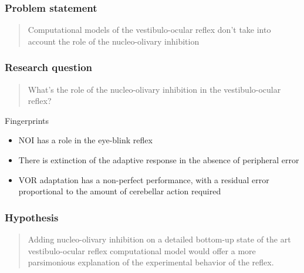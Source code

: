 \documentclass[10pt, compress]{beamer}
\begin{document}
\begin{frame}[fragile]
  \frametitle{Problem statement}
  \begin{quote}
    Computational models of the vestibulo-ocular reflex don't take into account the role of the nucleo-olivary inhibition
  \end{quote}
\end{frame}


\begin{frame}[fragile]
  \frametitle{Research question}
  \begin{quote}
    What's the role of the nucleo-olivary inhibition in the vestibulo-ocular reflex?
  \end{quote}
  \begin{block}{Fingerprints}
    \begin{itemize}
      \item NOI has a role in the eye-blink reflex
      \item There is extinction of the adaptive response in the absence of peripheral error
      \item VOR adaptation has a non-perfect performance, with a residual error proportional to the amount of cerebellar action required
    \end{itemize}
  \cite{Herreros2013b}
  \end{block}
\end{frame}


\begin{frame}[fragile]
  \frametitle{Hypothesis}
  \begin{quote}
    Adding nucleo-olivary inhibition on a detailed bottom-up state of the art vestibulo-ocular reflex computational model would offer a more
    parsimonious explanation of the experimental behavior of the reflex.
  \end{quote}
\end{frame}


\end{document}
